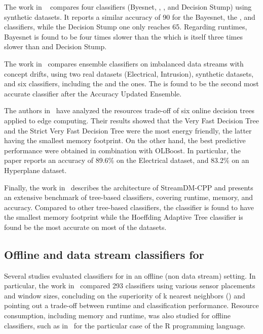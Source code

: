 The work in ~\cite{kaur2020} compares four classifiers (Byesnet,
\hoeffdingtree, \naivebayes, and Decision Stump) using synthetic datasets.
It reports a similar accuracy of 90 for the Bayesnet, the
\hoeffdingtree, and \naivebayes classifiers, while the Decision Stump one
only reaches 65. Regarding runtimes, Bayesnet is found to be four times
slower than the \hoeffdingtree which is itself three times slower than
\naivebayes and Decision Stump.

The work in~\cite{priya2020comprehensive} compares ensemble classifiers on
imbalanced data streams with concept drifts, using two real datasets
(Electrical, Intrusion), synthetic datasets, and six classifiers, including the
\naivebayes and the \hoeffdingtree ones. The \hoeffdingtree is found to be
the second most accurate classifier after the Accuracy Updated Ensemble.

The authors in~\cite{lopes2020evaluating} have analyzed the resources trade-off
of six online decision trees applied to edge computing. Their results showed that the
Very Fast Decision Tree and the Strict Very Fast Decision Tree were the most
energy friendly, the latter having the smallest memory footprint. On the
other hand, the best predictive performance were obtained in combination with
OLBoost. In particular, the paper reports an accuracy of 89.6\% on the Electrical
dataset, and 83.2\% on an Hyperplane dataset.

Finally, the work in~\cite{StreamDM-CPP} describes the architecture of
StreamDM-CPP and presents an extensive benchmark of tree-based classifiers,
covering runtime, memory, and accuracy. Compared to other tree-based
classifiers, the \hoeffdingtree classifier is found to have the smallest
memory footprint while the Hoeffding Adaptive Tree classifier is found be
the most accurate on most of the datasets. 

\subsection{Offline and data stream classifiers for \har}

Several studies evaluated classifiers for \har in an offline (non data stream)
setting. In particular, the work in~\cite{Janidarmian_2017} compared 293
classifiers using various sensor placements and window sizes, concluding on the
superiority of k nearest neighbors (\knn) and pointing out a trade-off between
runtime and classification performance. Resource consumption, including memory
and runtime, was also studied for offline classifiers, such as
in~\cite{memory_consumption_machine_learning} for the particular case of the R
programming language.

